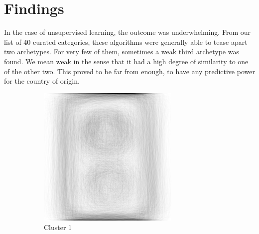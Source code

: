 \documentclass[a4paper, twocolumn]{article}
\begin{document}
\section{Findings\label{sec:Findings}}
In the case of unsupervised learning, the outcome was underwhelming. From our list of 40 curated categories, these algorithms were generally able to tease apart two archetypes. For very few of them, sometimes a weak third archetype was found. We mean weak in the sense that it had a high degree of similarity to one of the other two. This proved to be far from enough, to have any predictive power for the country of origin.

    \begin{figure}[H]
        \begin{subfigure}{.33\columnwidth}
            \centering
            \includegraphics[width=.9\textwidth]{figures/kmeans-cluster0.png}
            \caption{Cluster 1}
            \label{fig:kmeans-cluster0}
        \end{subfigure}%
        \begin{subfigure}{.33\columnwidth}
            \centering

\end{subfigure}
\end{figure}
\end{document}
